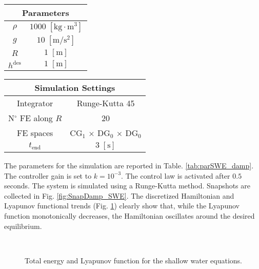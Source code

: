 \begin{table}[th]
	\centering
	\begin{tabular}{|c|c|}
		\hline 
		\multicolumn{2}{|c|}{Parameters} \\ 
		\hline 
		$\rho$ & $1000\; \mathrm{[kg \cdot m^3]}$ \\ 
		$g$& $10\; \mathrm{[m/s^2]}$ \\ 
		$R$& $1\; \mathrm{[m]}$\\ 
		$h^{\text{des}}$& $1\; \mathrm{[m]}$ \\ 
		\hline 
	\end{tabular} \hspace{1cm}
	\begin{tabular}{|c|c|}
		\hline 
		\multicolumn{2}{|c|}{Simulation Settings} \\
		\hline 
		Integrator & Runge-Kutta 45 \\
		N$^\circ$ FE along $R$ & 20 \\
		FE spaces & CG$_1$ $\times$ DG$_0$ $\times$ DG$_0$\\
		$t_{\text{end}}$ & $3\; \mathrm{[s]}$\\ 
		\hline 
	\end{tabular} 
	\captionsetup{width=0.95\linewidth}
	\vspace{1mm}
	\label{tab:parSWE_damp}
\end{table}

The parameters for the simulation are reported in Table. \eqref{tab:parSWE_damp}. The controller gain is set to $k = 10^{-3}$. The control law is activated after $0.5$ seconds. The system is simulated using a Runge-Kutta method. Snapshots are collected in Fig. \ref{fig:SnapDamp_SWE}. The discretized Hamiltonian and Lyapunov functional trends (Fig. \ref{fig:HL_SWE}) clearly show that, while the Lyapunov function monotonically decreases, the Hamiltonian oscillates around the desired equilibrium.



\begin{figure}[htb]%
	\centering
	\hspace{8pt}%
	 \\
	\caption{Total energy and Lyapunov function for the shallow water equations.}%
	\label{fig:HL_SWE}%
\end{figure}


